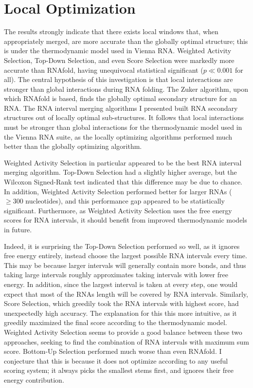 \documentclass{cshonours}
\begin{document}
\section{Local Optimization}
\label{sec:localopt}
The results strongly indicate that there exists local windows that, when appropriately merged, are more accurate than the globally optimal structure; this is under the thermodynamic model used in Vienna RNA. Weighted Activity Selection, Top-Down Selection, and even Score Selection were markedly more accurate than RNAfold, having unequivocal statistical significant ($p \ll 0.001$ for all). The central hypothesis of this investigation is that local interactions are stronger than global interactions during RNA folding. The Zuker algorithm, upon which RNAfold is based, finds the globally optimal secondary structure for an RNA. The RNA interval merging algorithms I presented built RNA secondary structures out of locally optimal sub-structures. It follows that local interactions must be stronger than global interactions for the thermodynamic model used in the Vienna RNA suite, as the locally optimizing algorithms performed much better than the globally optimizing algorithm.

Weighted Activity Selection in particular appeared to be the best RNA interval merging algorithm. Top-Down Selection had a slightly higher average, but the Wilcoxon Signed-Rank test indicated that this difference may be due to chance. In addition, Weighted Activity Selection performed better for larger RNAs ($\geq 300$ nucleotides), and this performance gap appeared to be statistically significant. Furthermore, as Weighted Activity Selection uses the free energy scores for RNA intervals, it should benefit from improved thermodynamic models in future.

Indeed, it is surprising the Top-Down Selection performed so well, as it ignores free energy entirely, instead choose the largest possible RNA intervals every time. This may be because larger intervals will generally contain more bonds, and thus taking large intervals roughly approximates taking intervals with lower free energy. In addition, since the largest interval is taken at every step, one would expect that most of the RNAs length will be covered by RNA intervals. Similarly, Score Selection, which greedily took the RNA intervals with highest score, had unexpectedly high accuracy. The explanation for this this more intuitive, as it greedily maximized the final score according to the thermodynamic model. Weighted Activity Selection seems to provide a good balance between these two approaches, seeking to find the combination of RNA intervals with maximum sum score. Bottom-Up Selection performed much worse than even RNAfold. I conjecture that this is because it does not optimize according to any useful scoring system; it always picks the smallest stems first, and ignores their free energy contribution.
\end{document}
